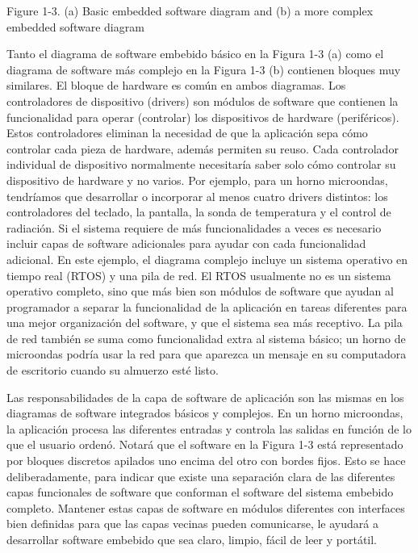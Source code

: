 \documentclass[output=paper, 
colorlinks,
citecolor=brown,
newtxmath
]{langscibook}
\begin{document}
Figure 1-3. (a) Basic embedded software diagram and (b) a more complex embedded software
diagram



Tanto el diagrama de software embebido básico en la Figura 1-3 (a) como el diagrama de software más complejo 
en la Figura 1-3 (b) contienen bloques muy similares. El bloque de hardware es común en ambos diagramas.
Los controladores de dispositivo (drivers) son módulos de software que contienen la funcionalidad 
para operar (controlar) los dispositivos de hardware (periféricos). Estos controladores
eliminan la necesidad de que la aplicación sepa cómo controlar cada pieza de hardware, además permiten su reuso. 
Cada controlador individual de dispositivo normalmente necesitaría saber solo cómo controlar su dispositivo de hardware y no varios. 
Por ejemplo, para un horno microondas, tendríamos que desarrollar o incorporar al menos cuatro drivers distintos: 
los controladores del teclado, la pantalla, la sonda de temperatura y el control de radiación.
Si el sistema requiere de más funcionalidades a veces es necesario incluir capas 
de software adicionales para ayudar con cada funcionalidad adicional. 
En este ejemplo, el diagrama complejo incluye un sistema operativo en tiempo real (RTOS) 
y una pila de red. El RTOS usualmente no es un sistema operativo completo, sino que más
bien son módulos de software que ayudan al programador a separar la funcionalidad 
de la aplicación en tareas diferentes para una mejor organización del software,
y que el sistema sea más receptivo. 
La pila de red también se suma como funcionalidad extra al sistema básico; 
un horno de microondas podría usar la red para que aparezca un mensaje 
en su computadora de escritorio cuando su almuerzo esté listo.





Las responsabilidades de la capa de software de aplicación son las mismas 
en los diagramas de software integrados básicos y complejos. 
En un horno microondas, la aplicación procesa las diferentes entradas 
y controla las salidas en función de lo que el usuario ordenó.
Notará que el software en la Figura 1-3 está representado por bloques 
discretos apilados uno encima del otro con bordes fijos. Esto se hace deliberadamente, 
para indicar que existe una separación clara de las diferentes capas funcionales 
de software que conforman el software del sistema embebido completo. 
Mantener estas capas de software en módulos diferentes con interfaces bien definidas para 
que las capas vecinas pueden comunicarse, le ayudará a desarrollar software embebido 
que sea claro, limpio, fácil de leer y portátil.
\end{document}
